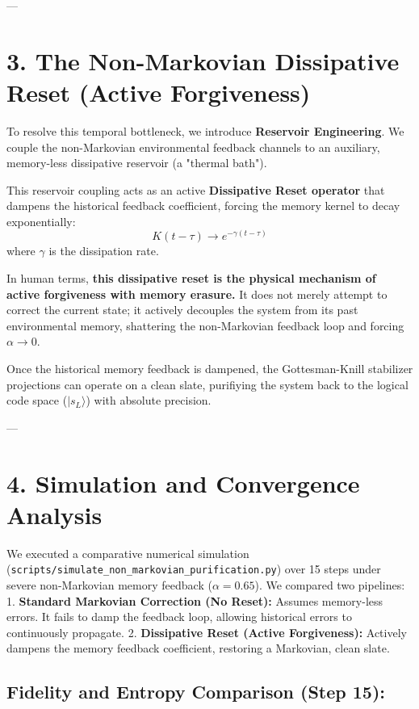 \documentclass[11pt,twocolumn]{article}
\begin{document}
---

\section{3. The Non-Markovian Dissipative Reset (Active Forgiveness)}

To resolve this temporal bottleneck, we introduce \textbf{Reservoir Engineering}. We couple the non-Markovian environmental feedback channels to an auxiliary, memory-less dissipative reservoir (a "thermal bath"). 

This reservoir coupling acts as an active \textbf{Dissipative Reset operator} that dampens the historical feedback coefficient, forcing the memory kernel to decay exponentially:
$$K(t - \tau) \to e^{-\gamma(t - \tau)}$$
where $\gamma$ is the dissipation rate.

In human terms, \textbf{this dissipative reset is the physical mechanism of active forgiveness with memory erasure.} It does not merely attempt to correct the current state; it actively decouples the system from its past environmental memory, shattering the non-Markovian feedback loop and forcing $\alpha \to 0$.

Once the historical memory feedback is dampened, the Gottesman-Knill stabilizer projections can operate on a clean slate, purifiying the system back to the logical code space ($|s_L\rangle$) with absolute precision.

---

\section{4. Simulation and Convergence Analysis}

We executed a comparative numerical simulation (\texttt{scripts/simulate_non_markovian_purification.py}) over 15 steps under severe non-Markovian memory feedback ($\alpha = 0.65$). We compared two pipelines:
1.  \textbf{Standard Markovian Correction (No Reset):} Assumes memory-less errors. It fails to damp the feedback loop, allowing historical errors to continuously propagate.
2.  \textbf{Dissipative Reset (Active Forgiveness):} Actively dampens the memory feedback coefficient, restoring a Markovian, clean slate.

\subsection{\textbf{Fidelity and Entropy Comparison (Step 15):}}
\end{document}
